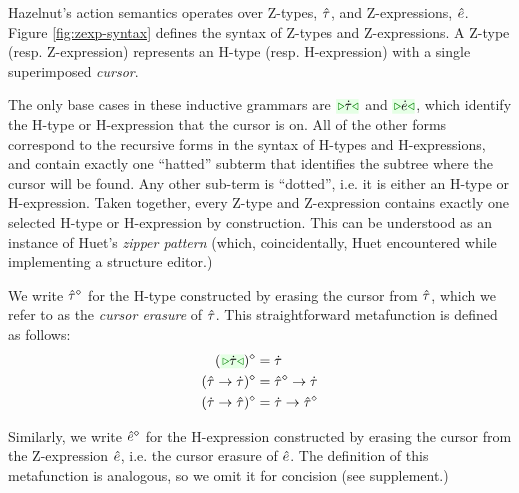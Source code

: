 Hazelnut's action semantics operates over Z-types, $\hat{\tau}$, and Z-expressions, $\hat{e}$. Figure \ref{fig:zexp-syntax} defines the syntax of Z-types and Z-expressions. A Z-type (resp. Z-expression) represents an H-type (resp. H-expression) with a single superimposed \emph{cursor}.

The only base cases in these inductive grammars are $\zwsel{\htau}$ and $\zwsel{\hexp}$, which identify the H-type or H-expression that the cursor is on. All of the other forms correspond to the recursive forms in the syntax of H-types and H-expressions, and contain exactly one ``hatted'' subterm that identifies the subtree where the cursor will be found. Any other sub-term is ``dotted'', i.e. it is either an H-type or H-expression. Taken together, every Z-type and Z-expression contains exactly one selected H-type or H-expression by construction. This can be understood as an instance of Huet's \emph{zipper pattern} \cite{JFP::Huet1997} (which, coincidentally, Huet encountered while implementing a structure editor.)

We write $\hat{\tau}^{\diamond}$ for the H-type constructed by erasing the cursor from $\hat{\tau}$, which we refer to as the \emph{cursor erasure} of $\hat{\tau}$. This straightforward metafunction is defined as follows:
\begin{align*}
\removeSel{(\zwsel{\htau})} & = \htau\\
\removeSel{(\tarr{\ztau}{\htau})} & = \tarr{\removeSel{\ztau}}{\htau}\\
\removeSel{(\tarr{\htau}{\ztau})} & = \tarr{\htau}{\removeSel{\ztau}}
\end{align*}

Similarly, we write $\hat{e}^{\diamond}$ for the H-expression constructed by erasing the cursor from the Z-expression $\hat{e}$, i.e. the cursor erasure of $\hat{e}$. The definition of this metafunction is analogous, so we omit it for concision (see supplement.)

